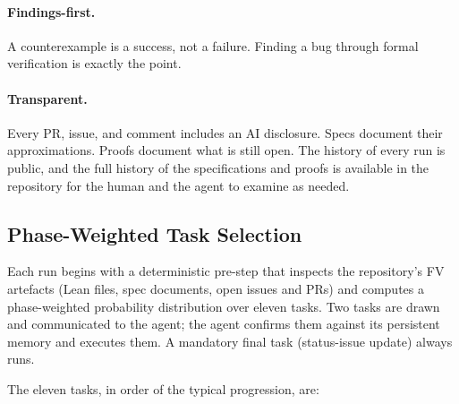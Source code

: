 \documentclass[sigconf,10pt]{acmart}
\begin{document}
\paragraph{Findings-first.} A counterexample is a success, not a failure.
Finding a bug through formal verification is exactly the point.

\paragraph{Transparent.} Every PR, issue, and comment includes an AI
disclosure.  Specs document their approximations.
Proofs document what is still open. The history of every run is public, and the
full history of the specifications and proofs is available in the repository for the
human and the agent to examine as needed.

\subsection{Phase-Weighted Task Selection}
\label{sec:tasksel}

Each run begins with a deterministic pre-step that inspects the
repository's FV artefacts (Lean files, spec documents, open issues and
PRs) and computes a phase-weighted probability distribution over
eleven tasks.  Two tasks are drawn and communicated to the agent;
the agent confirms them against its persistent memory and executes
them.  A mandatory final task (status-issue update) always runs.

The eleven tasks, in order of the typical progression, are:
\end{document}
